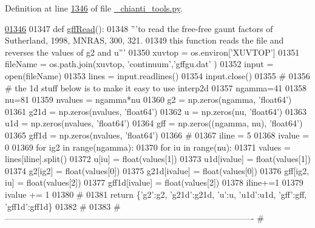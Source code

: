 Definition at line \hyperlink{__chianti__tools_8py_source_l01346}{1346} of file \hyperlink{__chianti__tools_8py_source}{\-\_\-chianti\-\_\-tools.\-py}.


\begin{DoxyCode}
\hypertarget{namespacepyneb_1_1utils_1_1__chianti__tools_l01346}{}\hyperlink{namespacepyneb_1_1utils_1_1__chianti__tools_a109ccb08244e615937df43b7a80a1625}{01346} 
01347 \textcolor{keyword}{def }\hyperlink{namespacepyneb_1_1utils_1_1__chianti__tools_a109ccb08244e615937df43b7a80a1625}{gffRead}():
01348     \textcolor{stringliteral}{'''to read the free-free gaunt factors of Sutherland, 1998, MNRAS, 300, 321.}
01349 \textcolor{stringliteral}{    this function reads the file and reverses the values of g2 and u'''}
01350     xuvtop = os.environ[\textcolor{stringliteral}{'XUVTOP'}]
01351     fileName = os.path.join(xuvtop, \textcolor{stringliteral}{'continuum'},\textcolor{stringliteral}{'gffgu.dat'} )
01352     input = open(fileName)
01353     lines = input.readlines()
01354     input.close()
01355     \textcolor{comment}{#}
01356     \textcolor{comment}{#  the 1d stuff below is to make it easy to use interp2d}
01357     ngamma=41
01358     nu=81
01359     nvalues = ngamma*nu
01360     g2 = np.zeros(ngamma, \textcolor{stringliteral}{'float64'})
01361     g21d = np.zeros(nvalues, \textcolor{stringliteral}{'float64'})
01362     u = np.zeros(nu, \textcolor{stringliteral}{'float64'})
01363     u1d = np.zeros(nvalues, \textcolor{stringliteral}{'float64'})
01364     gff = np.zeros((ngamma, nu), \textcolor{stringliteral}{'float64'})
01365     gff1d = np.zeros(nvalues, \textcolor{stringliteral}{'float64'})
01366     \textcolor{comment}{#}
01367     iline = 5
01368     ivalue = 0
01369     \textcolor{keywordflow}{for} ig2 \textcolor{keywordflow}{in} range(ngamma):
01370         \textcolor{keywordflow}{for} iu \textcolor{keywordflow}{in} range(nu):
01371             values = lines[iline].split()
01372             u[iu] = float(values[1])
01373             u1d[ivalue] = float(values[1])
01374             g2[ig2] = float(values[0])
01375             g21d[ivalue] = float(values[0])
01376             gff[ig2, iu] = float(values[2])
01377             gff1d[ivalue] = float(values[2])
01378             iline+=1
01379             ivalue += 1
01380     \textcolor{comment}{#}
01381     \textcolor{keywordflow}{return} \{\textcolor{stringliteral}{'g2'}:g2, \textcolor{stringliteral}{'g21d'}:g21d,  \textcolor{stringliteral}{'}\textcolor{stringliteral}{u':u, '}u1d':u1d,  'gff':gff,  'gff1d':gff1d\}
01382     \textcolor{comment}{#}
01383     \textcolor{comment}{# ----------------------------------------------------------------------------------------}
    \textcolor{comment}{#}
\end{DoxyCode}
